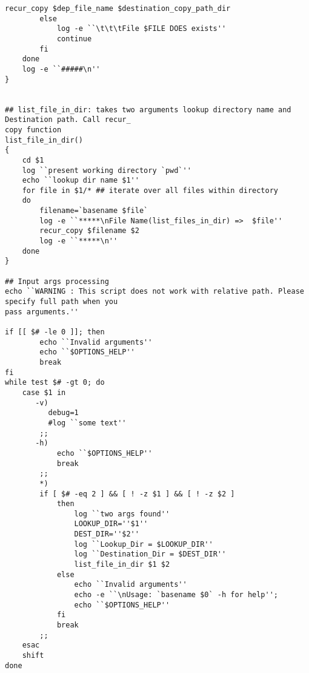 \begin{lstlisting}[language=bashy]
            recur_copy $dep_file_name $destination_copy_path_dir
        else
            log -e ``\t\t\tFile $FILE DOES exists''
            continue
        fi
    done    
    log -e ``#####\n'' 
}


## list_file_in_dir: takes two arguments lookup directory name and Destination path. Call recur_
copy function
list_file_in_dir()
{
    cd $1
    log ``present working directory `pwd`''
    echo ``lookup dir name $1''
    for file in $1/* ## iterate over all files within directory
    do
        filename=`basename $file`
        log -e ``*****\nFile Name(list_files_in_dir) =>  $file''
        recur_copy $filename $2
        log -e ``*****\n''
    done
}

## Input args processing
echo ``WARNING : This script does not work with relative path. Please specify full path when you 
pass arguments.''

if [[ $# -le 0 ]]; then
        echo ``Invalid arguments''
        echo ``$OPTIONS_HELP''
        break
fi
while test $# -gt 0; do
    case $1 in
       -v)
          debug=1
          #log ``some text''
        ;;
       -h)
            echo ``$OPTIONS_HELP''
            break
        ;;
        *)
        if [ $# -eq 2 ] && [ ! -z $1 ] && [ ! -z $2 ]
            then
                log ``two args found''
                LOOKUP_DIR=''$1''
                DEST_DIR=''$2''
                log ``Lookup_Dir = $LOOKUP_DIR''
                log ``Destination_Dir = $DEST_DIR''
                list_file_in_dir $1 $2
            else
                echo ``Invalid arguments''
                echo -e ``\nUsage: `basename $0` -h for help'';
                echo ``$OPTIONS_HELP''
            fi
            break
        ;;
    esac
    shift 
done



\end{lstlisting}

